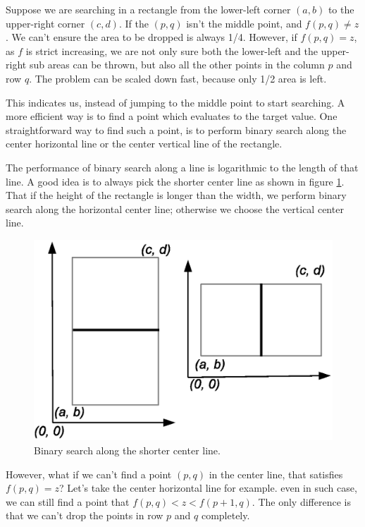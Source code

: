 \documentclass[UTF8]{article}
\begin{document}
Suppose we are searching in a rectangle from the lower-left corner $(a, b)$ to the upper-right corner $(c, d)$.
If the $(p, q)$ isn't the middle point, and $f(p, q) \neq z$. We can't ensure the area to be dropped is always
1/4. However, if $f(p, q) = z$, as $f$ is strict increasing, we are not only sure both the lower-left and the
upper-right sub areas can be thrown, but also all the other points in the column $p$ and row $q$. The problem
can be scaled down fast, because only 1/2 area is left.

This indicates us, instead of jumping to the middle point to start searching. A more efficient way is to find
a point which evaluates to the target value. One straightforward way to find such a point, is to perform
binary search along the center horizontal line or the center vertical line of the rectangle.

The performance of binary search along a line is logarithmic to the length of that line. A good idea is to always pick the shorter
center line as shown in figure \ref{fig:saddleback-centerline}. That if the height of the rectangle is longer
than the width, we perform binary search along the horizontal center line; otherwise we choose the vertical
center line.

\begin{figure}[htbp]
 \centering
 \includegraphics[scale=0.5]{img/saddleback-centerline.eps}
 \caption{Binary search along the shorter center line.}
 \label{fig:saddleback-centerline}
\end{figure}

However, what if we can't find a point $(p, q)$ in the center line, that satisfies $f(p, q) = z$? Let's take
the center horizontal line for example. even in such case, we can still find a point that
$f(p, q) < z < f(p+1, q)$. The only difference is that we can't drop the points in row $p$ and $q$ completely.
\end{document}
